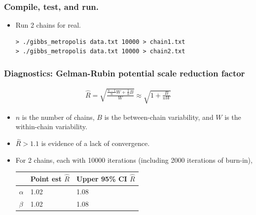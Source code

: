 \documentclass[handout]{beamer}
\providecommand{\wh}[1]{\widehat{#1}}
\numberwithin{equation}{section}
\begin{document}
\begin{frame}[fragile]
\frametitle{Compile, test, and run.}
\begin{itemize}
\begin{lstlisting}
==12942== 
==12942== HEAP SUMMARY:
==12942==     in use at exit: 1,453,685 bytes in 2,647 blocks
==12942==   total heap usage: 4,175 allocs, 1,528 frees, 2,706,460 bytes allocated
==12942== 
==12942== LEAK SUMMARY:
==12942==    definitely lost: 16 bytes in 1 blocks
==12942==    indirectly lost: 0 bytes in 0 blocks
==12942==      possibly lost: 39,184 bytes in 287 blocks
==12942==    still reachable: 1,414,485 bytes in 2,359 blocks
==12942==         suppressed: 0 bytes in 0 blocks
==12942== Rerun with --leak-check=full to see details of leaked memory
==12942== 
==12942== For counts of detected and suppressed errors, rerun with: -v
==12942== ERROR SUMMARY: 0 errors from 0 contexts (suppressed: 11 from 9)
\end{lstlisting}
\pause \item Run 2 chains for real.
\begin{lstlisting}
> ./gibbs_metropolis data.txt 10000 > chain1.txt
> ./gibbs_metropolis data.txt 10000 > chain2.txt
\end{lstlisting}
\end{itemize}
\end{frame}



\begin{frame}
\frametitle{Diagnostics: Gelman-Rubin potential scale reduction factor}
\begin{align*}
\wh{R}  = \sqrt{\frac{\frac{n-1}{n} W + \frac{1}{n} B}{W}} \approx \sqrt{1 + \frac{B}{nW}}
\end{align*}
\begin{itemize}
\pause \item $n$ is the number of chains, $B$ is the between-chain variability, and $W$ is the within-chain variability.
\pause \item $\wh{R} > 1.1$ is evidence of a lack of convergence.
\pause \item For 2 chains, each with 10000 iterations (including 2000 iterations of burn-in), 
\begin{center}
\begin{tabular}{l|l|l}
& Point est $\wh{R}$ & Upper 95\% CI $\wh{R}$ \\ \hline
$\alpha$ & 1.02 & 1.08 \\
$\beta$ & 1.02 & 1.08
\end{tabular}
\end{center}
\end{itemize}
\end{frame}
\end{document}
